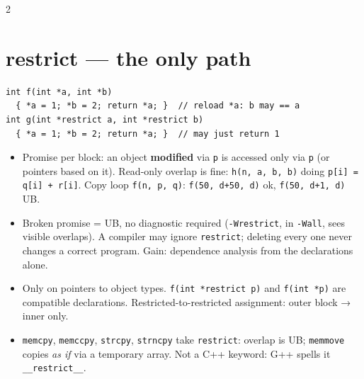 \documentclass[8pt]{extarticle}
\newcommand\ct[1]{\texttt{#1}}
\begin{document}
\begin{multicols}{2}
\section{restrict — the only path}
\begin{lstlisting}[style=CSheet]
int f(int *a, int *b)
  { *a = 1; *b = 2; return *a; }  // reload *a: b may == a
int g(int *restrict a, int *restrict b)
  { *a = 1; *b = 2; return *a; }  // may just return 1
\end{lstlisting}
\begin{itemize}
  \item Promise per block: an object \textbf{modified} via \ct{p} is accessed only via \ct{p}
        (or pointers based on it). Read-only overlap is fine: \ct{h(n, a, b, b)} doing
        \ct{p[i] = q[i] + r[i]}. Copy loop \ct{f(n, p, q)}: \ct{f(50, d+50, d)} ok,
        \ct{f(50, d+1, d)} UB.
  \item Broken promise = UB, no diagnostic required (\ct{-Wrestrict}, in \ct{-Wall}, sees
        visible overlaps). A compiler may ignore \ct{restrict}; deleting every one never changes
        a correct program. Gain: dependence analysis from the declarations alone.
  \item Only on pointers to object types. \ct{f(int *restrict p)} and \ct{f(int *p)} are
        compatible declarations. Restricted-to-restricted assignment: outer block → inner only.
  \item \ct{memcpy}, \ct{memccpy}, \ct{strcpy}, \ct{strncpy} take \ct{restrict}: overlap is UB;
        \ct{memmove} copies \emph{as if} via a temporary array. Not a C++ keyword: G++ spells it
        \ct{\_\_restrict\_\_}.
\end{itemize}

\columnbreak


\end{multicols}
\end{document}
